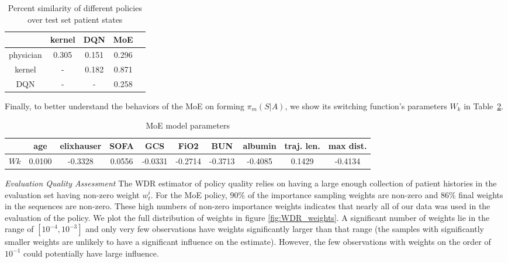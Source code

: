 \documentclass[10pt]{amia}
\begin{document}
\begin{table}[H]
\centering
\caption{Percent similarity of different policies over test set patient states}
\label{tbl:overlap}
\begin{tabular}{|c|c|c|c|c|}
\hline
           & kernel & DQN   & MoE   \\ \hline
physician  & 0.305  & 0.151 & 0.296 \\ \hline
kernel     & -      & 0.182 & 0.871 \\ \hline
DQN        & -      & -     & 0.258 \\ \hline
\end{tabular}
\end{table}

Finally, to better understand the behaviors of the MoE on forming $\pi_{m}(S|A)$, we show its switching function's parameters $W_{k}$ in Table~\ref{tbl:moe_params}.

\begin{table}[ht]
\centering
\caption{MoE model parameters}
\label{tbl:moe_params}
\begin{tabular}{|c|c|c|c|c|c|c|c|c|c|}
\hline
       & age    & elixhauser & SOFA   & GCS     & FiO2    & BUN     & albumin & traj. len. & max dist.\\ \hline
$W{k}$ & 0.0100 & -0.3328    & 0.0556 & -0.0331 & -0.2714 & -0.3713 & -0.4085 & 0.1429     & -0.4134  \\ \hline
\end{tabular}
\end{table}

\textit{Evaluation Quality Assessment}
The WDR estimator of policy quality relies on having a large enough collection of patient histories in the evaluation set having non-zero weight $w_t^i$.  For the MoE policy, $90\%$ of the importance sampling weights are non-zero and $86\%$ final weights in the sequences are non-zero. These high numbers of non-zero importance weights indicates that nearly all of our data was used in the evaluation of the policy.  We plot the full distribution of weights in figure \ref{fig:WDR_weights}. A significant number of weights lie in the range of $[10^{-4},10^{-3}]$ and only very few observations have weights significantly larger than that range (the samples with significantly smaller weights are unlikely to have a significant influence on the estimate). However, the few observations with weights on the order of $10^{-1}$ could potentially have large influence.
\end{document}
